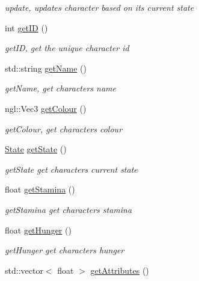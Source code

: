 \begin{DoxyCompactItemize}
\begin{DoxyCompactList}\small\item\em update, updates character based on its current state \end{DoxyCompactList}\item 
int \hyperlink{class_character_a0f2a503680ae812a5c324248bec247bb}{get\+I\+D} ()
\begin{DoxyCompactList}\small\item\em get\+I\+D, get the unique character id \end{DoxyCompactList}\item 
std\+::string \hyperlink{class_character_aec5f06c80515bb29947563a593b8c404}{get\+Name} ()
\begin{DoxyCompactList}\small\item\em get\+Name, get character\textquotesingle{}s name \end{DoxyCompactList}\item 
ngl\+::\+Vec3 \hyperlink{class_character_a5c50042d62f4571929ecb4dd6ac932f1}{get\+Colour} ()
\begin{DoxyCompactList}\small\item\em get\+Colour, get character\textquotesingle{}s colour \end{DoxyCompactList}\item 
\hyperlink{_character_8hpp_a5d74787dedbc4e11c1ab15bf487e61f8}{State} \hyperlink{class_character_a2fe65d95953e3a8596e3c190098919c4}{get\+State} ()
\begin{DoxyCompactList}\small\item\em get\+State get character\textquotesingle{}s current state \end{DoxyCompactList}\item 
float \hyperlink{class_character_aff4485c3630339cc58a8cd94e66b98ba}{get\+Stamina} ()
\begin{DoxyCompactList}\small\item\em get\+Stamina get character\textquotesingle{}s stamina \end{DoxyCompactList}\item 
float \hyperlink{class_character_a565e052b24d0513bfa742a1d50f31ce2}{get\+Hunger} ()
\begin{DoxyCompactList}\small\item\em get\+Hunger get character\textquotesingle{}s hunger \end{DoxyCompactList}\item 
std\+::vector$<$ float $>$ \hyperlink{class_character_a798b8383c2562f7f6c54c40a425cd941}{get\+Attributes} ()

\end{DoxyCompactItemize}
